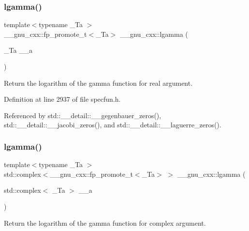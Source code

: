 \subsubsection{\texorpdfstring{lgamma()}{lgamma()}\hspace{0.1cm}{\footnotesize\ttfamily [1/2]}}
{\footnotesize\ttfamily template$<$typename \+\_\+\+Ta $>$ \\
\+\_\+\+\_\+gnu\+\_\+cxx\+::fp\+\_\+promote\+\_\+t$<$\+\_\+\+Ta$>$ \+\_\+\+\_\+gnu\+\_\+cxx\+::lgamma (\begin{DoxyParamCaption}\item[{\+\_\+\+Ta}]{\+\_\+\+\_\+a }\end{DoxyParamCaption})\hspace{0.3cm}{\ttfamily [inline]}}

Return the logarithm of the gamma function for real argument. 

Definition at line 2937 of file specfun.\+h.



Referenced by std\+::\+\_\+\+\_\+detail\+::\+\_\+\+\_\+gegenbauer\+\_\+zeros(), std\+::\+\_\+\+\_\+detail\+::\+\_\+\+\_\+jacobi\+\_\+zeros(), and std\+::\+\_\+\+\_\+detail\+::\+\_\+\+\_\+laguerre\+\_\+zeros().

\mbox{\label{group__gnu__math__spec__func_ga93530dc48fbf301835215cdffedc42d8}} 
\subsubsection{\texorpdfstring{lgamma()}{lgamma()}\hspace{0.1cm}{\footnotesize\ttfamily [2/2]}}
{\footnotesize\ttfamily template$<$typename \+\_\+\+Ta $>$ \\
std\+::complex$<$\+\_\+\+\_\+gnu\+\_\+cxx\+::fp\+\_\+promote\+\_\+t$<$\+\_\+\+Ta$>$ $>$ \+\_\+\+\_\+gnu\+\_\+cxx\+::lgamma (\begin{DoxyParamCaption}\item[{std\+::complex$<$ \+\_\+\+Ta $>$}]{\+\_\+\+\_\+a }\end{DoxyParamCaption})\hspace{0.3cm}{\ttfamily [inline]}}

Return the logarithm of the gamma function for complex argument. 

